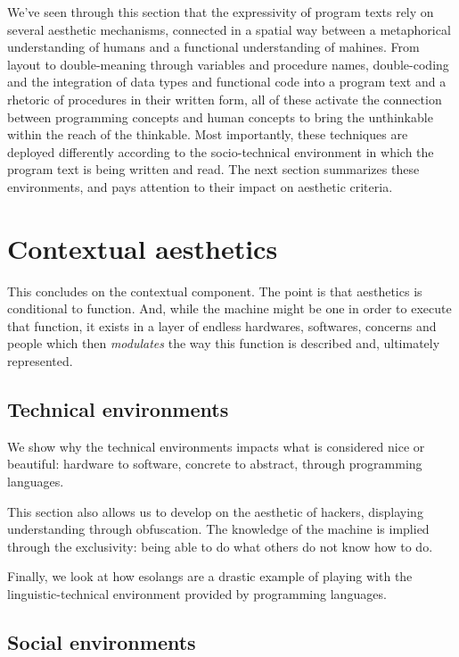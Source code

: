 We've seen through this section that the expressivity of program texts rely on several aesthetic mechanisms, connected in a spatial way between a metaphorical understanding of humans and a functional understanding of mahines. From layout to double-meaning through variables and procedure names, double-coding and the integration of data types and functional code into a program text and a rhetoric of procedures in their written form, all of these activate the connection between programming concepts and human concepts to bring the unthinkable within the reach of the thinkable. Most importantly, these techniques are deployed differently according to the socio-technical environment in which the program text is being written and read. The next section summarizes these environments, and pays attention to their impact on aesthetic criteria.

\section{Contextual aesthetics} %
\label{sec:contextual-aesthetics}

This concludes on the contextual component. The point is that aesthetics is conditional to function. And, while the machine might be one in order to execute that function, it exists in a layer of endless hardwares, softwares, concerns and people which then \emph{modulates} the way this function is described and, ultimately represented.

\subsection{Technical environments}
\label{subsec:technical-environments}

We show why the technical environments impacts what is considered nice or beautiful: hardware to software, concrete to abstract, through programming languages.

This section also allows us to develop on the aesthetic of hackers, displaying understanding through obfuscation. The knowledge of the machine is implied through the exclusivity: being able to do what others do not know how to do.

Finally, we look at how esolangs are a drastic example of playing with the linguistic-technical environment provided by programming languages.

\subsection{Social environments}
\label{subsec:social-environments}

